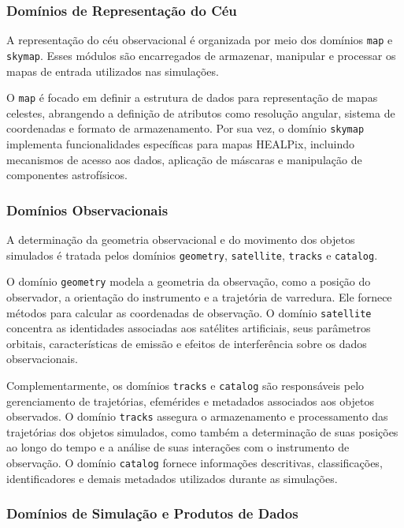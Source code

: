 \subsubsection{Domínios de Representação do Céu}

A representação do céu observacional é organizada por meio dos domínios \texttt{map} e \texttt{skymap}. Esses módulos são encarregados de armazenar, manipular e processar os mapas de entrada utilizados nas simulações.

O \texttt{map} é focado em definir a estrutura de dados para representação de mapas celestes, abrangendo a definição de atributos como resolução angular, sistema de coordenadas e formato de armazenamento. Por sua vez, o domínio \texttt{skymap} implementa funcionalidades específicas para mapas HEALPix, incluindo mecanismos de acesso aos dados, aplicação de máscaras e manipulação de componentes astrofísicos.

\subsubsection{Domínios Observacionais}

A determinação da geometria observacional e do movimento dos objetos simulados é tratada pelos domínios \texttt{geometry}, \texttt{satellite}, \texttt{tracks} e \texttt{catalog}.

O domínio \texttt{geometry} modela a geometria da observação, como a posição do observador, a orientação do instrumento e a trajetória de varredura. Ele fornece métodos para calcular as coordenadas de observação. O domínio \texttt{satellite} concentra as identidades associadas aos satélites artificiais, seus parâmetros orbitais, características de emissão e efeitos de interferência sobre os dados observacionais.

Complementarmente, os domínios \texttt{tracks} e \texttt{catalog} são responsáveis pelo gerenciamento de trajetórias, efemérides e metadados associados aos objetos observados. O domínio \texttt{tracks} assegura o armazenamento e processamento das trajetórias dos objetos simulados, como também a determinação de suas posições ao longo do tempo e a análise de suas interações com o instrumento de observação. O domínio \texttt{catalog} fornece informações descritivas, classificações, identificadores e demais metadados utilizados durante as simulações.

\subsubsection{Domínios de Simulação e Produtos de Dados}

